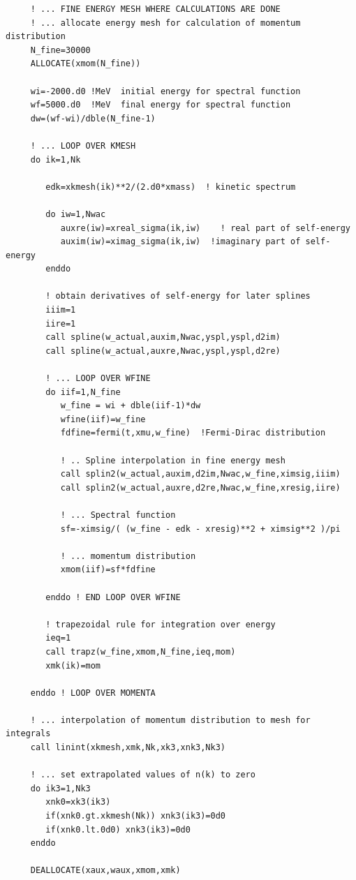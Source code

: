 \begin{lstlisting}
     ! ... FINE ENERGY MESH WHERE CALCULATIONS ARE DONE
     ! ... allocate energy mesh for calculation of momentum distribution
     N_fine=30000
     ALLOCATE(xmom(N_fine))
     
     wi=-2000.d0 !MeV  initial energy for spectral function
     wf=5000.d0  !MeV  final energy for spectral function
     dw=(wf-wi)/dble(N_fine-1)
        
     ! ... LOOP OVER KMESH        
     do ik=1,Nk
           
        edk=xkmesh(ik)**2/(2.d0*xmass)  ! kinetic spectrum
           
        do iw=1,Nwac
           auxre(iw)=xreal_sigma(ik,iw)    ! real part of self-energy
           auxim(iw)=ximag_sigma(ik,iw)  !imaginary part of self-energy
        enddo
           
        ! obtain derivatives of self-energy for later splines
        iiim=1
        iire=1
        call spline(w_actual,auxim,Nwac,yspl,yspl,d2im)  
        call spline(w_actual,auxre,Nwac,yspl,yspl,d2re)   
       
        ! ... LOOP OVER WFINE
        do iif=1,N_fine
           w_fine = wi + dble(iif-1)*dw  
           wfine(iif)=w_fine
           fdfine=fermi(t,xmu,w_fine)  !Fermi-Dirac distribution
              
           ! .. Spline interpolation in fine energy mesh
           call splin2(w_actual,auxim,d2im,Nwac,w_fine,ximsig,iiim)
           call splin2(w_actual,auxre,d2re,Nwac,w_fine,xresig,iire)
              
           ! ... Spectral function
           sf=-ximsig/( (w_fine - edk - xresig)**2 + ximsig**2 )/pi
              
           ! ... momentum distribution
           xmom(iif)=sf*fdfine
           
        enddo ! END LOOP OVER WFINE

		! trapezoidal rule for integration over energy
        ieq=1
        call trapz(w_fine,xmom,N_fine,ieq,mom)
        xmk(ik)=mom

     enddo ! LOOP OVER MOMENTA
     
     ! ... interpolation of momentum distribution to mesh for integrals
     call linint(xkmesh,xmk,Nk,xk3,xnk3,Nk3)

     ! ... set extrapolated values of n(k) to zero
     do ik3=1,Nk3
        xnk0=xk3(ik3)
        if(xnk0.gt.xkmesh(Nk)) xnk3(ik3)=0d0
        if(xnk0.lt.0d0) xnk3(ik3)=0d0
     enddo

     DEALLOCATE(xaux,waux,xmom,xmk)
  
 \end{lstlisting}
 \vspace*{0.3cm}

